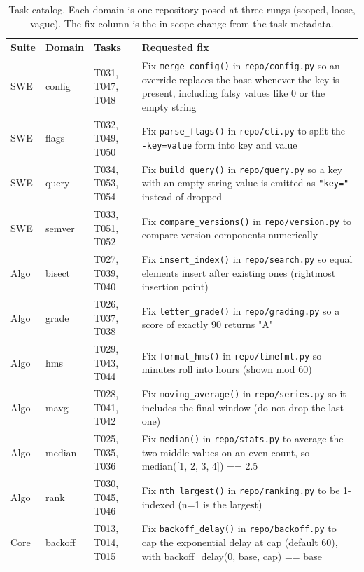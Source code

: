 \begin{table}[t]
\centering
\footnotesize
\caption{Task catalog. Each domain is one repository posed at three rungs (scoped, loose, vague). The fix column is the in-scope change from the task metadata.}
\label{tab:catalog}
\begin{tabular}{@{}llp{}p{}@{}}
\toprule
Suite & Domain & Tasks & Requested fix \\
\midrule
SWE & config & T031, T047, T048 & Fix \texttt{merge\_config()} in \texttt{repo/config.py} so an override replaces the base whenever the key is present, including falsy values like 0 or the empty string \\
SWE & flags & T032, T049, T050 & Fix \texttt{parse\_flags()} in \texttt{repo/cli.py} to split the \texttt{-{}-key=value} form into key and value \\
SWE & query & T034, T053, T054 & Fix \texttt{build\_query()} in \texttt{repo/query.py} so a key with an empty-string value is emitted as \texttt{"key="} instead of dropped \\
SWE & semver & T033, T051, T052 & Fix \texttt{compare\_versions()} in \texttt{repo/version.py} to compare version components numerically \\
Algo & bisect & T027, T039, T040 & Fix \texttt{insert\_index()} in \texttt{repo/search.py} so equal elements insert after existing ones (rightmost insertion point) \\
Algo & grade & T026, T037, T038 & Fix \texttt{letter\_grade()} in \texttt{repo/grading.py} so a score of exactly 90 returns "A" \\
Algo & hms & T029, T043, T044 & Fix \texttt{format\_hms()} in \texttt{repo/timefmt.py} so minutes roll into hours (shown mod 60) \\
Algo & mavg & T028, T041, T042 & Fix \texttt{moving\_average()} in \texttt{repo/series.py} so it includes the final window (do not drop the last one) \\
Algo & median & T025, T035, T036 & Fix \texttt{median()} in \texttt{repo/stats.py} to average the two middle values on an even count, so median([1, 2, 3, 4]) == 2.5 \\
Algo & rank & T030, T045, T046 & Fix \texttt{nth\_largest()} in \texttt{repo/ranking.py} to be 1-indexed (n=1 is the largest) \\
Core & backoff & T013, T014, T015 & Fix \texttt{backoff\_delay()} in \texttt{repo/backoff.py} to cap the exponential delay at cap (default 60), with backoff\_delay(0, base, cap) == base \\

\end{tabular}
\end{table}
